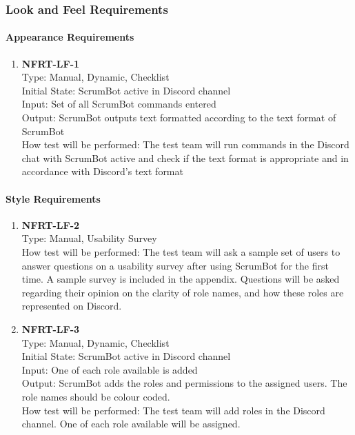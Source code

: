 \documentclass[12pt, titlepage]{article}
\begin{document}
\subsubsection{Look and Feel Requirements}
\paragraph{Appearance Requirements}
\begin{enumerate}
    \item{\textbf{NFRT-LF-1}}\\
    Type: Manual, Dynamic, Checklist\\
    Initial State: ScrumBot active in Discord channel\\
    Input: Set of all ScrumBot commands entered\\
    Output: ScrumBot outputs text formatted according to the text format of ScrumBot\\
    How test will be performed: The test team will run commands in the Discord chat with ScrumBot active and check if the text format is appropriate and in accordance with Discord's text format
\end{enumerate}

\paragraph{Style Requirements}
\begin{enumerate}
    \item{\textbf{NFRT-LF-2}}\\
    Type: Manual, Usability Survey\\
    How test will be performed: The test team will ask a sample set of users to answer questions on a usability survey after using ScrumBot for the first time. A sample survey is included in the appendix. Questions will be asked regarding their opinion on the clarity of role names, and how these roles are represented on Discord.
    
    \item{\textbf{NFRT-LF-3}}\\
    Type: Manual, Dynamic, Checklist\\
    Initial State: ScrumBot active in Discord channel\\
    Input: One of each role available is added\\
    Output: ScrumBot adds the roles and permissions to the assigned users. The role names  should be colour coded.\\
    How test will be performed: The test team will add roles in the Discord channel. One of each role available will be assigned.
\end{enumerate}
\end{document}
